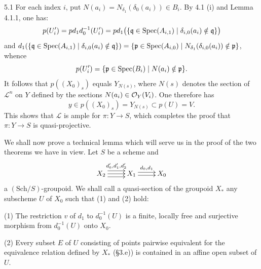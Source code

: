 \begin{remark}{5.1}
For each index $i$, put $N(a_i)=N_{\delta_1}(\delta_0(a_i))\in B_i$. By 4.1 (i) and Lemma 4.1.1, one has:
\[
p(U'_i)=pd_1d_0^{-1}(U'_i)=pd_1\bigl(\{\mathfrak q\in\operatorname{Spec}(A_{i,1})\mid\delta_{i,0}(a_i)\notin\mathfrak q\}\bigr)
\]
and $d_1(\{\mathfrak q\in\operatorname{Spec}(A_{i,1})\mid\delta_{i,0}(a_i)\notin\mathfrak q\})=\{\mathfrak p\in\operatorname{Spec}(A_{i,0})\mid N_{\delta_1}(\delta_{i,0}(a_i))\notin\mathfrak p\}$, whence
\[
p(U'_i)=\{\mathfrak p\in\operatorname{Spec}(B_i)\mid N(a_i)\notin\mathfrak p\}.
\]
It follows that $p((X_0)_s)$ equals $Y_{N(s)}$, where $N(s)$ denotes the section of $\mathcal L^n$ on $Y$ defined by the sections $N(a_i)\in\mathcal{O}_Y(V_i)$. One therefore has
\[
y\in p((X_0)_s)=Y_{N(s)}\subset p(U)=V.\tag{$*$}
\]
This shows that $\mathcal L$ is ample for $\pi:Y\to S$, which completes the proof that $\pi:Y\to S$ is quasi-projective.
\end{remark}

We shall now prove a technical lemma which will serve us in the proof of the two theorems we have in view. Let $S$ be a scheme and
\[
\xymatrix{X_2\ar@<1ex>[r]^{d'_0,d'_1,d'_2}\ar[r]\ar@<-1ex>[r]&X_1\ar@<.5ex>[r]^{d_0,d_1}\ar@<-.5ex>[r]&X_0}
\]
a $(\mathrm{Sch}/S)$-groupoid. We shall call a quasi-section of the groupoid $X_*$ any subscheme $U$ of $X_0$ such that (1) and (2) hold:

(1) The restriction $v$ of $d_1$ to $d_0^{-1}(U)$ is a finite, locally free and surjective morphism from $d_0^{-1}(U)$ onto $X_0$.

(2) Every subset $E$ of $U$ consisting of points pairwise equivalent for the equivalence relation defined by $X_*$ (§3.e)) is contained in an affine open subset of $U$.

